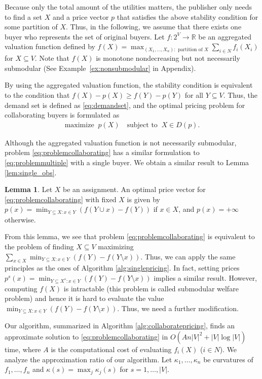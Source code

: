 \documentclass[letterpaper]{article}
\theoremstyle{definition}
\newtheorem{lemma}[theorem]{Lemma}
\begin{document}
Because only the total amount of the utilities matters, the publisher only needs to find a set $X$ and a price vector $p$ that satisfies the above stability condition for some partition of $X$.
Thus, in the following, we assume that there exists one buyer who
represents the set of original buyers.
Let $f: 2^V \to \mathbb{R}$ be an aggregated valuation function defined by
$f(X) = \max_{(X_1,\dots,X_n):\text{ partition of } X}  \sum_{i\in N}f_i(X_i)$
for $X \subseteq V$.
Note that $f(X)$ is monotone nondecreasing but not necessarily submodular %
(See Example~\ref{ex:nonsubmodular} in Appendix).


By using the aggregated valuation function,
the stability condition is equivalent to the condition that $ f(X) - p(X) \ge f(Y) - p(Y)$
for all $Y \subseteq V$.
Thus, the demand set is defined as \eqref{eq:demandset}, and the optimal pricing problem for collaborating buyers is formulated as
\begin{align}
\label{eq:problemcollaborating}
\text{maximize} \; \; p(X) \quad
\text{subject to} \; \; X \in D(p).
\end{align}

Although the aggregated valuation function
is not necessarily submodular, problem \eqref{eq:problemcollaborating} has a similar formulation to \eqref{eq:problemmultiple} with a single buyer.
We obtain a similar result to Lemma \ref{lem:single_obs}.
\begin{lemma}\label{lem:collaborating_obs}
Let $X$ be an assignment.
An optimal price vector for \eqref{eq:problemcollaborating} with fixed $X$ is given by
$p(x) =  \min_{Y\subseteq X: x\in Y}(f(Y\cup x) - f(Y))$ if $x \in X$, and $p(x) = +\infty$ otherwise.
\end{lemma}

From this lemma, we see that problem \eqref{eq:problemcollaborating} is equivalent to the problem of finding $X \subseteq V$ maximizing $\sum_{x \in X} \min_{Y\subseteq X: x\in Y}(f(Y) - f(Y \setminus x))$.
Thus, we can apply the same principles as the ones of Algorithm \ref{alg:singlepricing}.
In fact, setting prices $p^s(x)=\min_{Y\subseteq X^s: x\in Y}(f(Y)-f(Y\setminus x))$ implies a similar result.
However, computing $f(X)$ is intractable (this problem is called submodular welfare problem)
and hence
it is hard to evaluate the value \(\min_{Y\subseteq X: x\in Y}(f(Y)-f(Y\setminus x))\).
Thus, we need a further modification.


Our algorithm, summarized in Algorithm \ref{alg:collaboratepricing},
finds an approximate solution to \eqref{eq:problemcollaborating}
in $O(A n |V|^2 + |V| \log |V|)$ time,
where $A$ is the computational cost of evaluating $f_i(X)$ ($i \in N$).
We analyze the approximation ratio of our algorithm.
Let $\kappa_1, \ldots, \kappa_n$ be curvatures of $f_1, \ldots, f_n$
and \(\kappa(s) = \max_j \kappa_j (s)\) for $s=1,\dots,|V|$.
\end{document}
